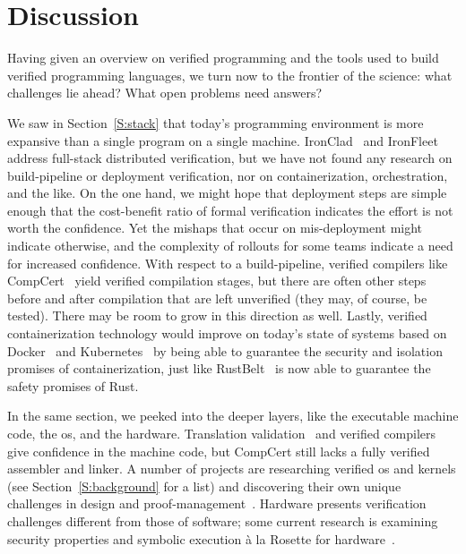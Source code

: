 \section{Discussion}\label{S:discussion}

Having given an overview on verified programming and the tools used to build
verified programming languages, we turn now to the frontier of the science: what
challenges lie ahead? What open problems need answers?

We saw in Section~\ref{S:stack} that today's programming environment is more
expansive than a single program on a single machine.
IronClad~\cite{hawblitzel2014ironclad} and
IronFleet~\cite{hawblitzel2015ironfleet} address full-stack distributed
verification, but we have not found any research on build-pipeline or deployment
verification, nor on containerization, orchestration, and the like. On the one
hand, we might hope that deployment steps are simple enough that the
cost-benefit ratio of formal verification indicates the effort is not worth the
confidence. Yet the mishaps that occur on mis-deployment might indicate
otherwise, and the complexity of rollouts for some teams indicate a need for
increased confidence. With respect to a build-pipeline, verified compilers like
CompCert~\cite{Kastner-LBSSF-2017} yield verified compilation stages, but there
are often other steps before and after compilation that are left unverified
(they may, of course, be tested). There may be room to grow in this direction as
well. Lastly, verified containerization technology would improve on today's
state of systems based on Docker~\cite{merkel2014docker} and
Kubernetes~\cite{k8s} by being able to guarantee the security and isolation
promises of containerization, just like RustBelt~\cite{Jung_2018a} is now able
to guarantee the safety promises of Rust.

In the same section, we peeked into the deeper layers, like the executable
machine code, the \gls{os}, and the hardware. Translation
validation~\cite{Pnueli_1998} and verified compilers give confidence in the
machine code, but CompCert still lacks a fully verified assembler and linker. A
number of projects are researching verified \gls{os} and kernels (see
Section~\ref{S:background} for a list) and discovering their own unique
challenges in design and proof-management~\cite{Klein_AEMSKH_14}. Hardware
presents verification challenges different from those of software; some current
research is examining security properties and symbolic execution \`{a} la
Rosette for hardware~\cite{zhang2018end}.

